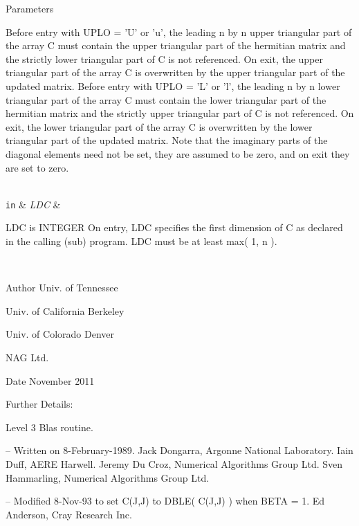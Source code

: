 \begin{DoxyParams}[1]{Parameters}
\begin{DoxyVerb}
           Before entry  with  UPLO = 'U' or 'u',  the leading  n by n
           upper triangular part of the array C must contain the upper
           triangular part  of the  hermitian matrix  and the strictly
           lower triangular part of C is not referenced.  On exit, the
           upper triangular part of the array  C is overwritten by the
           upper triangular part of the updated matrix.
           Before entry  with  UPLO = 'L' or 'l',  the leading  n by n
           lower triangular part of the array C must contain the lower
           triangular part  of the  hermitian matrix  and the strictly
           upper triangular part of C is not referenced.  On exit, the
           lower triangular part of the array  C is overwritten by the
           lower triangular part of the updated matrix.
           Note that the imaginary parts of the diagonal elements need
           not be set,  they are assumed to be zero,  and on exit they
           are set to zero.\end{DoxyVerb}
\\
\hline
\mbox{\tt in}  & {\em L\+D\+C} & \begin{DoxyVerb}          LDC is INTEGER
           On entry, LDC specifies the first dimension of C as declared
           in  the  calling  (sub)  program.   LDC  must  be  at  least
           max( 1, n ).\end{DoxyVerb}
 \\
\hline
\end{DoxyParams}
\begin{DoxyAuthor}{Author}
Univ. of Tennessee 

Univ. of California Berkeley 

Univ. of Colorado Denver 

N\+A\+G Ltd. 
\end{DoxyAuthor}
\begin{DoxyDate}{Date}
November 2011 
\end{DoxyDate}
\begin{DoxyParagraph}{Further Details\+: }
\begin{DoxyVerb}  Level 3 Blas routine.

  -- Written on 8-February-1989.
     Jack Dongarra, Argonne National Laboratory.
     Iain Duff, AERE Harwell.
     Jeremy Du Croz, Numerical Algorithms Group Ltd.
     Sven Hammarling, Numerical Algorithms Group Ltd.

  -- Modified 8-Nov-93 to set C(J,J) to DBLE( C(J,J) ) when BETA = 1.
     Ed Anderson, Cray Research Inc.\end{DoxyVerb}
 
\end{DoxyParagraph}
\hypertarget{group__complex16__blas__level3_ga263a46a500f5c7f04bee1b75ea7f64f6}{}
